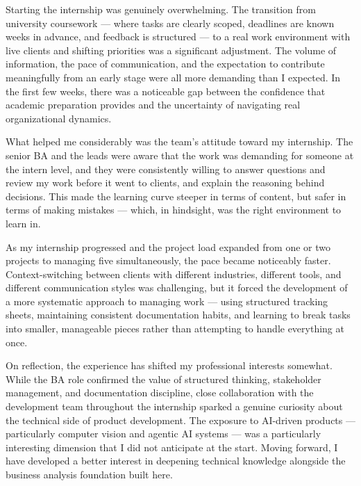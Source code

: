 Starting the internship was genuinely overwhelming. The transition from university coursework — where tasks are clearly scoped, deadlines are known weeks in advance, and feedback is structured — to a real work environment with live clients and shifting priorities was a significant adjustment. The volume of information, the pace of communication, and the expectation to contribute meaningfully from an early stage were all more demanding than I expected. In the first few weeks, there was a noticeable gap between the confidence that academic preparation provides and the uncertainty of navigating real organizational dynamics.

What helped me considerably was the team's attitude toward my internship. The senior BA and the leads were aware that the work was demanding for someone at the intern level, and they were consistently willing to answer questions and review my work before it went to clients, and explain the reasoning behind decisions. This made the learning curve steeper in terms of content, but safer in terms of making mistakes — which, in hindsight, was the right environment to learn in.

As my internship progressed and the project load expanded from one or two projects to managing five simultaneously, the pace became noticeably faster. Context-switching between clients with different industries, different tools, and different communication styles was challenging, but it forced the development of a more systematic approach to managing work — using structured tracking sheets, maintaining consistent documentation habits, and learning to break tasks into smaller, manageable pieces rather than attempting to handle everything at once.

On reflection, the experience has shifted my professional interests somewhat. While the BA role confirmed the value of structured thinking, stakeholder management, and documentation discipline, close collaboration with the development team throughout the internship sparked a genuine curiosity about the technical side of product development. The exposure to AI-driven products — particularly computer vision and agentic AI systems — was a particularly interesting dimension that I did not anticipate at the start. Moving forward, I have developed a better interest in deepening technical knowledge alongside the business analysis foundation built here.
